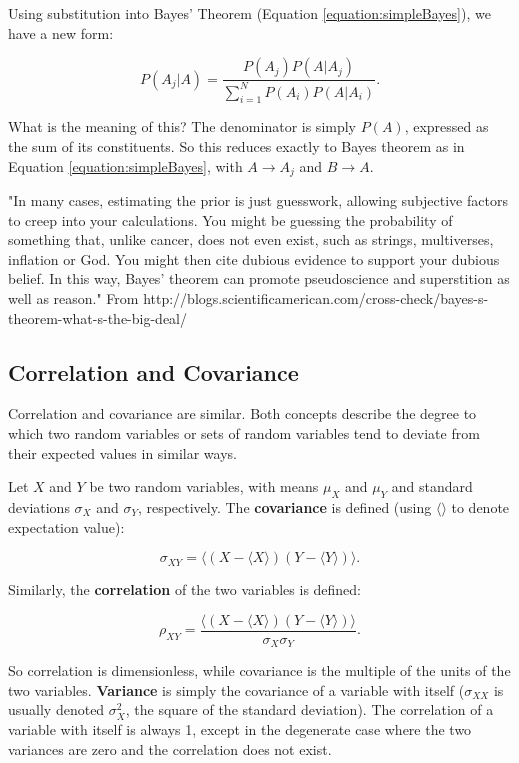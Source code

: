 Using substitution into Bayes' Theorem (Equation \ref{equation:simpleBayes}), we have a new form:

\begin{equation}
P(A_{j} | A) = \frac{P(A_{j}) P(A | A_{j})}{\sum_{i=1}^{N} P(A_{i}) P(A|A_{i})}.
\end{equation}

What is the meaning of this? The denominator is simply $P(A)$, expressed as the sum of its constituents. So this reduces exactly to Bayes theorem as in Equation \ref{equation:simpleBayes}, with $A \rightarrow A_{j}$ and $B \rightarrow A$.

"In many cases, estimating the prior is just guesswork, allowing subjective factors to creep into your calculations. You might be guessing the probability of something that, unlike cancer, does not even exist, such as strings, multiverses, inflation or God. You might then cite dubious evidence to support your dubious belief. In this way, Bayes' theorem can promote pseudoscience and superstition as well as reason." From http://blogs.scientificamerican.com/cross-check/bayes-s-theorem-what-s-the-big-deal/

\subsection{Correlation and Covariance}

Correlation and covariance are similar. Both concepts describe the degree to which two random variables or sets of random variables tend to deviate from their expected values in similar ways.

Let $X$ and $Y$ be two random variables, with means $\mu_{X}$ and $\mu_{Y}$ and standard deviations $\sigma_{X}$ and $\sigma_{Y}$, respectively. The \textbf{covariance} is defined (using $\langle \rangle$ to denote expectation value):

\begin{equation}
\sigma_{XY} = \langle (X - \langle X \rangle) (Y - \langle Y \rangle) \rangle.
\end{equation}

Similarly, the \textbf{correlation} of the two variables is defined:

\begin{equation}
\rho_{XY} = \frac{\langle (X - \langle X \rangle) (Y - \langle Y \rangle) \rangle}{\sigma_{X} \sigma_{Y}}.
\end{equation}

So correlation is dimensionless, while covariance is the multiple of the units of the two variables. \textbf{Variance} is simply the covariance of a variable with itself ($\sigma_{XX}$ is usually denoted $\sigma_{X}^{2}$, the square of the standard deviation). The correlation of a variable with itself is always 1, except in the degenerate case where the two variances are zero and the correlation does not exist.  

